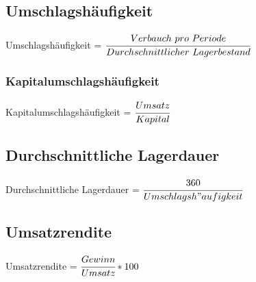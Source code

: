 \documentclass[a4paper,12pt]{scrartcl}
\begin{document}
\subsection{Umschlagshäufigkeit}
Umschlagshäufigkeit = $\cfrac{Verbauch~pro~Periode}{Durchschnittlicher~Lagerbestand}$
\subsubsection{Kapitalumschlagshäufigkeit}
Kapitalumschlagshäufigkeit = $\cfrac{Umsatz}{Kapital}$

\subsection{Durchschnittliche Lagerdauer} 
Durchschnittliche Lagerdauer = $\cfrac{360}{Umschlagsh"aufigkeit}$ 

\subsection{Umsatzrendite} 
Umsatzrendite = $\cfrac{Gewinn}{Umsatz} * 100$ 
\end{document}
